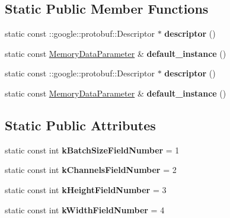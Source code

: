 \subsection*{Static Public Member Functions}
\begin{DoxyCompactItemize}
\item 
\mbox{\label{classcaffe_1_1_memory_data_parameter_a0064b318d5249531e0d74ed295d020ac}} 
static const \+::google\+::protobuf\+::\+Descriptor $\ast$ {\bfseries descriptor} ()
\item 
\mbox{\label{classcaffe_1_1_memory_data_parameter_ae7dffdbf2fe34775d39a4906e43e9493}} 
static const \mbox{\hyperlink{classcaffe_1_1_memory_data_parameter}{Memory\+Data\+Parameter}} \& {\bfseries default\+\_\+instance} ()
\item 
\mbox{\label{classcaffe_1_1_memory_data_parameter_ad26738b6223c288aa729c1d2c70796a8}} 
static const \+::google\+::protobuf\+::\+Descriptor $\ast$ {\bfseries descriptor} ()
\item 
\mbox{\label{classcaffe_1_1_memory_data_parameter_afbdb6793a4c836b9ddfb6d864c78fa1a}} 
static const \mbox{\hyperlink{classcaffe_1_1_memory_data_parameter}{Memory\+Data\+Parameter}} \& {\bfseries default\+\_\+instance} ()
\end{DoxyCompactItemize}
\subsection*{Static Public Attributes}
\begin{DoxyCompactItemize}
\item 
\mbox{\label{classcaffe_1_1_memory_data_parameter_af7a2d2411e163424f720c997fcc9cc6e}} 
static const int {\bfseries k\+Batch\+Size\+Field\+Number} = 1
\item 
\mbox{\label{classcaffe_1_1_memory_data_parameter_aa001dae064495c8164908bc10dacb356}} 
static const int {\bfseries k\+Channels\+Field\+Number} = 2
\item 
\mbox{\label{classcaffe_1_1_memory_data_parameter_a54b6dd5c96c64f20244f3e13f600d207}} 
static const int {\bfseries k\+Height\+Field\+Number} = 3
\item 
\mbox{\label{classcaffe_1_1_memory_data_parameter_ac7a145785dcbb6781eaefb385331c4c5}} 
static const int {\bfseries k\+Width\+Field\+Number} = 4
\end{DoxyCompactItemize}
